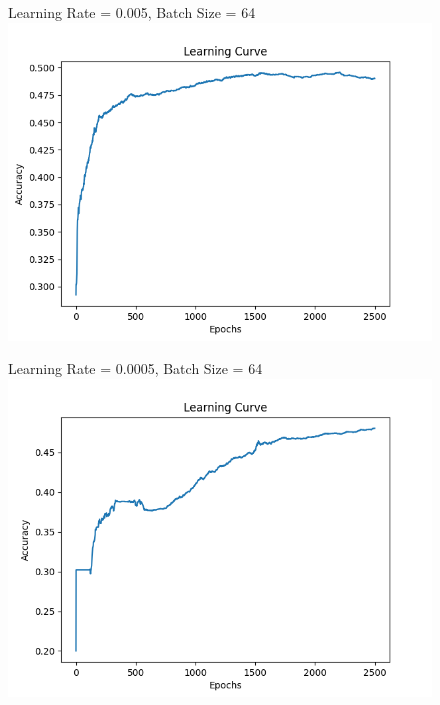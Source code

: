 \documentclass[12pt]{article}
\begin{document}
\begin{figure}[H]
    \begin{minipage}{0.45\textwidth}
        Learning Rate = 0.005, Batch Size = 64
        \includegraphics[width=\textwidth]{Learning_Rate_005.png}
    \end{minipage}
    \hfill
    \begin{minipage}{0.45\textwidth}
        Learning Rate = 0.0005, Batch Size = 64
        \includegraphics[width=\textwidth]{Learning_Rate_0005.png}
    \end{minipage}


\end{figure}
\end{document}
